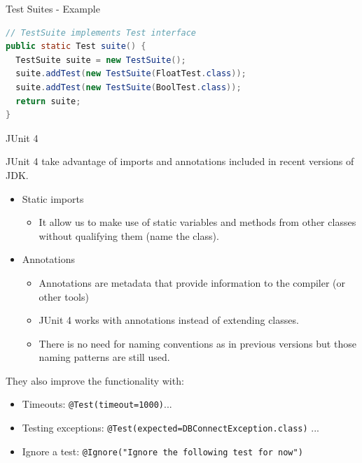 \documentclass[11pt, xcolor=svgnames]{beamer}
\begin{document}

\begin{frame}[fragile]{Test Suites - Example}

\begin{lstlisting}[language=JAVA,basicstyle=\scriptsize]
// TestSuite implements Test interface
public static Test suite() {
  TestSuite suite = new TestSuite();
  suite.addTest(new TestSuite(FloatTest.class));
  suite.addTest(new TestSuite(BoolTest.class));
  return suite;
}
\end{lstlisting}

\end{frame}




\begin{frame}{JUnit 4}

JUnit 4 take advantage of imports and annotations included in recent versions of JDK.
\begin{itemize}
 \item Static imports
 
    \begin{itemize}
    \item It allow us to make use of static variables and methods from other classes without qualifying them (name the class).
    \end{itemize}

 \item Annotations 
    \begin{itemize}
    \item Annotations are metadata that provide information to the compiler (or other tools)
    \item JUnit 4 works with annotations instead of extending classes.
    \item There is no need for naming conventions as in previous versions but those naming patterns are still used. 
    \end{itemize}

\end{itemize}

They also improve the functionality with:
\begin{itemize}
 \item Timeouts: \texttt{@Test(timeout=1000)}...
 \item Testing exceptions: \texttt{@Test(expected=DBConnectException.class)} ...
 \item Ignore a test: \texttt{@Ignore("Ignore the following test for now")}
  \end{itemize}


\end{frame}
\end{document}

